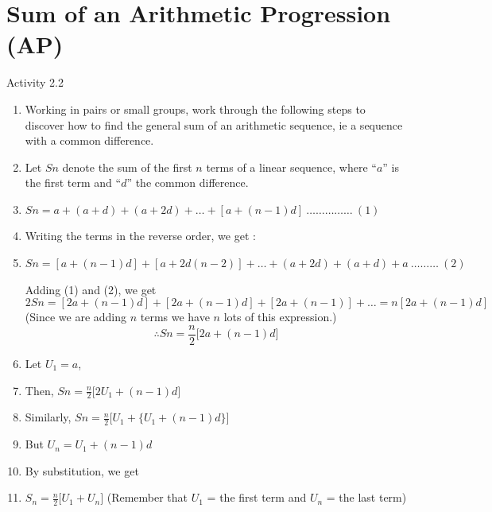 \section{Sum of an Arithmetic Progression (AP)}

\begin{activity}{Activity 2.2}
\begin{enumerate}
  \item Working in pairs or small groups, work through the following steps to
  discover how to find the general sum of an arithmetic sequence, ie a
  sequence with a common difference.
  \item Let $Sn$ denote the sum of the first $n$ terms of a linear sequence, where
  ``$a$'' is the first term and ``$d$'' the common difference.
  \item $Sn = a + (a+d) + (a+2d) + \ldots + [a+(n-1)d] \ \ldots\ldots\ldots\ldots\ldots\ (1)$
  \item Writing the terms in the reverse order, we get :
  \item $Sn = [a+(n-1)d] + [a+2d(n-2)] + \ldots + (a+2d) + (a+d) + a \ \ldots\ldots\ldots\ (2)$

  Adding (1) and (2), we get
  \[
    2Sn = [2a+(n-1)d] + [2a+(n-1)d] + [2a+(n-1)] + \ldots = n[2a+(n-1)d]
  \]
  (Since we are adding $n$ terms we have $n$ lots of this expression.)
  \[
    \therefore Sn = \frac{n}{2}\big[2a + (n-1)d\big]
  \]
  \item Let $U_1 = a$,
  \item Then, $Sn = \frac{n}{2}\big[2U_1 + (n-1)d\big]$
  \item Similarly, $Sn = \frac{n}{2}\big[U_1 + \{U_1 + (n-1)d\}\big]$
  \item But $U_n = U_1 + (n-1)d$
  \item By substitution, we get
  \item $S_n = \frac{n}{2}\big[U_1 + U_n\big]$ (Remember that $U_1$ = the first term and $U_n$ = the last term)
\end{enumerate}
\end{activity}

